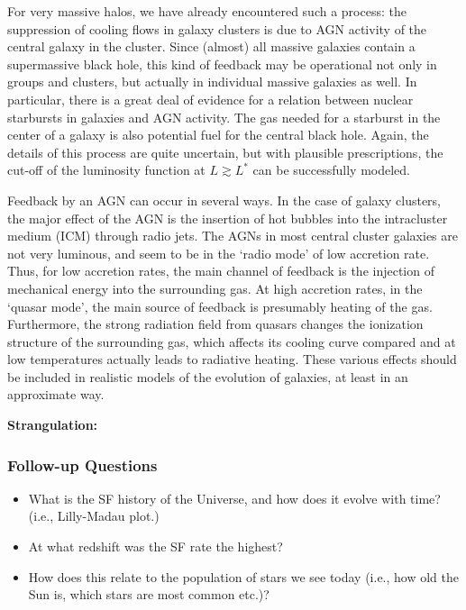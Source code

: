 \documentclass[a4paper,11pt]{article}
\begin{document}
{\noindent}For very massive halos, we have already encountered such a process: the suppression of cooling flows in galaxy clusters is due to AGN activity of the central galaxy in the cluster. Since (almost) all massive galaxies contain a supermassive black hole, this kind of feedback may be operational not only in groups and clusters, but actually in individual massive galaxies as well. In particular, there is a great deal of evidence for a relation between nuclear starbursts in galaxies and AGN activity. The gas needed for a starburst in the center of a galaxy is also potential fuel for the central black hole. Again, the details of this process are quite uncertain, but with plausible prescriptions, the cut-off of the luminosity function at $L\gtrsim L^*$ can be successfully modeled.

{\noindent}Feedback by an AGN can occur in several ways. In the case of galaxy clusters, the major effect of the AGN is the insertion of hot bubbles into the intracluster medium (ICM) through radio jets. The AGNs in most central cluster galaxies are not very luminous, and seem to be in the `radio mode' of low accretion rate. Thus, for low accretion rates, the main channel of feedback is the injection of mechanical energy into the surrounding gas. At high accretion rates, in the `quasar mode', the main source of feedback is presumably heating of the gas. Furthermore, the strong radiation field from quasars changes the ionization structure of the surrounding gas, which affects its cooling curve compared and at low temperatures actually leads to radiative heating. These various effects should be included in realistic models of the evolution of galaxies, at least in an approximate way.

{\noindent}\textbf{Strangulation:}

\subsubsection{Follow-up Questions}

\begin{itemize}
    \item What is the SF history of the Universe, and how does it evolve with time? (i.e., Lilly-Madau plot.)
    \item At what redshift was the SF rate the highest?
    \item How does this relate to the population of stars we see today (i.e., how old the Sun is, which stars are most common etc.)?
\end{itemize}
\end{document}
